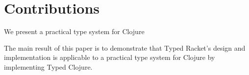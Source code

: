\section{Contributions}

We present a practical type system for Clojure

The main result of this paper is to demonstrate that Typed Racket's design
and implementation is applicable to a practical type system for Clojure
by implementing Typed Clojure.

